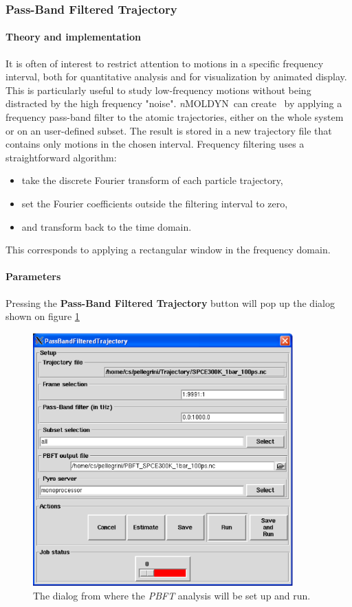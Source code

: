 \documentclass[a4paper,11pt]{report}
\newcommand{\NMOLDYN}{\textit{n}MOLDYN}
\begin{document}
\subsubsection{Pass-Band Filtered Trajectory}
\label{pbft}
\paragraph{Theory and implementation\\}
\label{pbft_theory}
It is often of interest to restrict attention to motions in a specific frequency interval, both for quantitative analysis 
and for visualization by animated display. This is particularly useful to study low-frequency motions without being 
distracted by the high frequency "noise". \NMOLDYN\ can create \PBFT\ by applying a frequency pass-band filter to the 
atomic trajectories, either on the whole system or on an user-defined subset. The result is stored in a new trajectory file that contains only motions in the 
chosen interval. Frequency filtering uses a straightforward algorithm:
\begin{itemize}
\item take the discrete Fourier transform of each particle trajectory,
\item set the Fourier coefficients outside the filtering interval to zero,
\item and transform back to the time domain.
\end{itemize} 
This corresponds to applying a rectangular window in the frequency domain.

\paragraph{Parameters\\}
\label{pbft_parameters}
Pressing the \textbf{Pass-Band Filtered Trajectory} button will pop up the dialog shown on figure \ref{fig:pbft}
\begin{figure}[h!]
\begin{center}
\includegraphics[width=10cm]{Figures/pbft.eps}
\end{center}
\caption[The \textit{PBFT} analysis dialog]{The dialog from where the \textit{PBFT} analysis will be set up and run.}
\label{fig:pbft}
\end{figure}   
\end{document}
